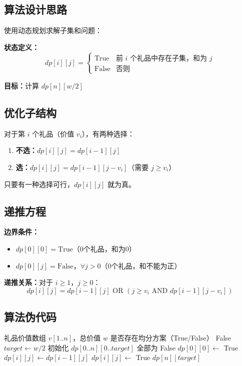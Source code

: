 \documentclass[UTF8,12pt,a4paper]{ctexart}
\begin{document}
\subsection*{算法设计思路}

使用动态规划求解子集和问题：

\textbf{状态定义：}
$$dp[i][j] = \begin{cases}
\text{True} & \text{前 } i \text{ 个礼品中存在子集，和为 } j \\
\text{False} & \text{否则}
\end{cases}$$

\textbf{目标：}计算 $dp[n][w/2]$

\subsection*{优化子结构}

对于第 $i$ 个礼品（价值 $v_i$），有两种选择：
\begin{enumerate}
	\item \textbf{不选：}$dp[i][j] = dp[i-1][j]$
	\item \textbf{选：}$dp[i][j] = dp[i-1][j-v_i]$（需要 $j \geq v_i$）
\end{enumerate}

只要有一种选择可行，$dp[i][j]$ 就为真。

\subsection*{递推方程}

\textbf{边界条件：}
\begin{itemize}
	\item $dp[0][0] = \text{True}$（0个礼品，和为0）
	\item $dp[0][j] = \text{False}$，$\forall j > 0$（0个礼品，和不能为正）
\end{itemize}

\textbf{递推关系：}对于 $i \geq 1$，$j \geq 0$：
$$dp[i][j] = dp[i-1][j] \text{ OR } (j \geq v_i \text{ AND } dp[i-1][j-v_i])$$

\subsection*{算法伪代码}

\begin{algorithm}[H]
	\caption{礼品均分验证（动态规划）}
	\begin{algorithmic}[1]
		\Require 礼品价值数组 $v[1..n]$，总价值 $w$
		\Ensure 是否存在均分方案（True/False）
		 
			\State \Return False 
		\EndIf
		\State $target \gets w / 2$
		\State 初始化 $dp[0..n][0..target]$ 全部为 False
		\State $dp[0][0] \gets$ True
				\State $dp[i][j] \gets dp[i-1][j]$ 
					\State $dp[i][j] \gets$ True 
				\EndIf
			\EndFor
		\EndFor
		\State \Return $dp[n][target]$
	\end{algorithmic}
\end{algorithm}
\end{document}
